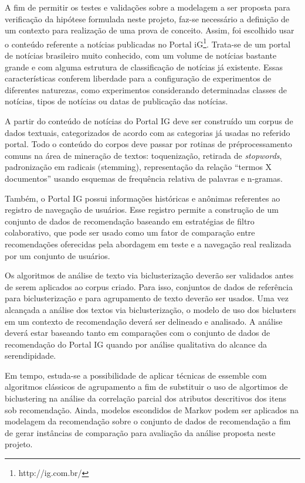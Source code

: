 \documentclass[normaltoc, espacoumemeio, pnumromarab,ruledheader]{abnt}
\begin{document}
A fim de permitir os testes e validações sobre a modelagem a ser proposta para verificação da hipótese formulada neste projeto, faz-se necessário a definição de um contexto para realização de uma prova de conceito. Assim, foi escolhido usar o conteúdo referente a notícias publicadas no Portal iG\footnote{http://ig.com.br/}. Trata-se de um portal de notícias brasileiro muito conhecido, com um volume de notícias bastante grande e com alguma estrutura de classificação de notícias já existente. Essas características conferem liberdade para a configuração de experimentos de diferentes naturezas, como experimentos considerando determinadas classes de notícias, tipos de notícias ou datas de publicação das notícias.

A partir do conteúdo de notícias do Portal IG deve ser construído um corpus de dados textuais, categorizados de acordo com as categorias já usadas no referido portal. Todo o conteúdo do corpos deve passar por rotinas de préprocessamento comuns na área de mineração de textos: toquenização, retirada de \textit{stopwords}, padronização em radicais (stemming), representação da relação ``termos X documentos'' usando esquemas de frequência relativa de palavras e n-gramas.

Também, o Portal IG possui informações históricas e anônimas referentes ao registro de navegação de usuários. Esse registro permite a construção de um conjunto de dados de recomendação baseando em estratégias de filtro colaborativo, que pode ser usado como um fator de comparação entre recomendações oferecidas pela abordagem em teste e a navegação real realizada por um conjunto de usuários.

Os algoritmos de análise de texto via biclusterização deverão ser validados antes de serem aplicados ao corpus criado. Para isso, conjuntos de dados de referência para biclusterização e para agrupamento de texto deverão ser usados. Uma vez alcançada a análise dos textos via biclusterização, o modelo de uso dos biclusters em um contexto de recomendação deverá ser delineado e analisado. A análise deverá estar baseando tanto em comparações com o conjunto de dados de recomendação do Portal IG quando por análise qualitativa do alcance da serendipidade. 

Em tempo, estuda-se a possibilidade de aplicar técnicas de essemble com algoritmos clássicos de agrupamento a fim de substituir o uso de algortimos de biclustering na análise da correlação parcial dos atributos descritivos dos itens sob recomendação. Ainda, modelos escondidos de Markov podem ser aplicados na modelagem da recomendação sobre o conjunto de dados de recomendação a fim de gerar instâncias de comparação para avaliação da análise proposta neste projeto.
\end{document}
